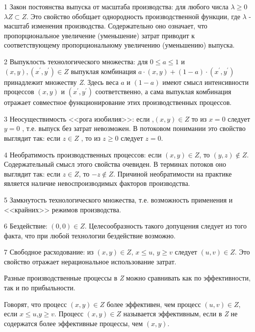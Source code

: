 \documentclass[12pt, 4paper]{book}
\begin{document}
{1 Закон постоянства выпуска от масштаба производства: для любого числа $\lambda \geq 0 $ $\lambda Z \subset Z$. Это свойство обобщает однородность производственной функции, где $\lambda$ - масштаб изменения производства. Содержательно оно означает, что пропорциональное увеличение (уменьшение) затрат приводит к соответствующему пропорциональному увеличению (уменьшению) выпуска.
\par

2 Выпуклость технологического множества: для $0 \leq a \leq 1$ и $(x,y),(x^{'},y^{'}) \in Z$ выпуклая комбинация $a \cdot (x,y)+(1-a) \cdot (x^{'},y^{'})$ принадлежит множеству \textit{Z}. Здесь веса $a$ и $(1-a)$ имеют смысл интенсивности процессов $(x,y)$ и $(x^{'},y^{'})$ соответственно, а сама выпуклая комбинация отражает совместное функционирование этих производственных процессов.
\par

3 Неосуществимость <<рога изобилия>>: если ,$(x,y)\in Z$ то из $x=0$ следует $y=0$ , т.е. выпуск без затрат невозможен. В потоковом понимании это свойство выглядит так: если $z \in Z$ , то  из $z \geq 0$ следует $z=0$.
\par

4 Необратимость производственных процессов: если $(x,y) \in Z$, то $(y,z) \notin Z$. Содержательный смысл этого свойства очевиден. В терминах потоков оно выглядит так: если $z \in Z$, то $-z \notin Z$. Причиной необратимости на практике является наличие невоспроизводимых факторов производства.
\par

5 Замкнутость технологического множества, т.е. возможность применения и <<крайних>> режимов производства.
\par

6 Бездействие: $(0,0) \in Z$. Целесообразность такого допущения следует из того факта, что при любой технологии бездействие возможно.
\par

7 Свободное расходование: из $(x,y)\in Z$, $x \leq u$, $y \geq v$ следует $(u,v) \in Z$. Это свойство отражает нерациональное использование затрат.
\par

Разные производственные процессы в \textit{Z} можно сравнивать как по эффективности, так и по прибыльности.
\par

Говорят, что процесс $(x,y) \in Z$ более эффективен, чем процесс $(u,v) \in Z$, если $x \leq u$,$y \geq v$. Процесс $(x,y) \in Z$ называется эффективным, если в \textit{Z} не содержатся более эффективные процессы, чем $(x,y)$.
\par

}
\end{document}

